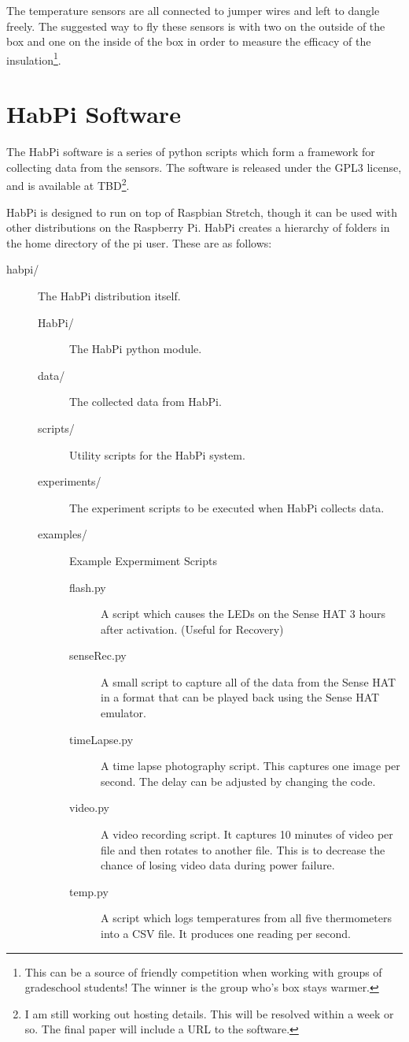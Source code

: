 \documentclass[journal]{new-aiaa}
\begin{document}
The temperature sensors are all connected to jumper wires and left to
dangle freely.  The suggested way to fly these sensors is with two on
the outside of the box and one on the inside of the box in order to
measure the efficacy of the insulation\footnote{This can be
a source of friendly competition when working with groups of
gradeschool students! The winner is the group who's box stays warmer.}.

\section{HabPi Software}
The HabPi software is a series of python scripts which form
a framework for collecting data from the sensors.  The software is
released under the GPL3 license, and is available at TBD\footnote{I am
still working out hosting details.  This will be resolved within
a week or so. The final paper will include a URL to the software.}.

HabPi is designed to run on top of Raspbian Stretch, though it can be
used with other distributions on the Raspberry Pi. HabPi creates
a hierarchy of folders in the home directory of the pi user.  These
are as follows:
\begin{description}
    \item[habpi/] The HabPi distribution itself.
    \begin{description}
        \item[HabPi/] The HabPi python module.
        \item[data/] The collected data from HabPi.
        \item[scripts/] Utility scripts for the HabPi system.
        \item[experiments/] The experiment scripts to be executed when
        HabPi collects data.
        \item[examples/] Example Expermiment Scripts
        \begin{description}
            \item[flash.py] A script which causes the LEDs
            on the Sense HAT 3 hours after activation.  (Useful for
            Recovery)
            \item[senseRec.py] A small script to capture all of the
            data from the Sense HAT in a format that can be played
            back using the Sense HAT emulator.
            \item[timeLapse.py] A time lapse photography script.  This
            captures one image per second.  The delay can be adjusted
            by changing the code.
            \item[video.py] A video recording script.  It captures 10
            minutes of video per file and then rotates to another
            file.  This is to decrease the chance of losing video data
            during power failure.
            \item[temp.py] A script which logs temperatures from all
            five thermometers into a CSV file.  It produces one
            reading per second.
        \end{description}
    \end{description}
\end{description}
\end{document}
